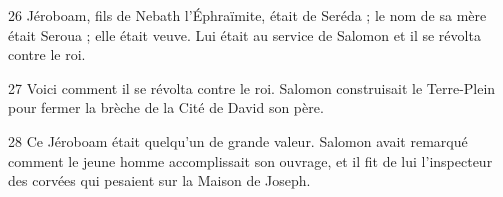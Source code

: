 26 Jéroboam, fils de Nebath l’Éphraïmite, était de Seréda ; le nom de sa mère était Seroua ; elle était veuve. Lui était au service de Salomon et il se révolta contre le roi.

27 Voici comment il se révolta contre le roi. Salomon construisait le Terre-Plein pour fermer la brèche de la Cité de David son père.

28 Ce Jéroboam était quelqu’un de grande valeur. Salomon avait remarqué comment le jeune homme accomplissait son ouvrage, et il fit de lui l’inspecteur des corvées qui pesaient sur la Maison de Joseph.
